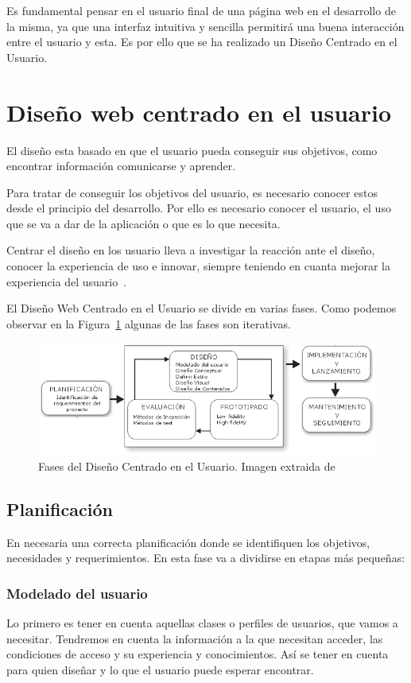 
Es fundamental pensar en el usuario final de una página web en el desarrollo de la misma, ya que una interfaz intuitiva y sencilla permitirá una buena interacción entre el usuario y esta. Es por ello que se ha realizado un Diseño Centrado en el Usuario.
\section{Diseño web centrado en el usuario}
El diseño esta basado en que el usuario pueda conseguir sus objetivos, como encontrar información comunicarse y aprender.

Para tratar de conseguir los objetivos del usuario, es necesario conocer estos desde el principio del desarrollo. Por ello es necesario conocer el usuario, el uso que se va a dar de la aplicación o que es lo que necesita.

Centrar el diseño en los usuario lleva a investigar la reacción ante el diseño, conocer la experiencia de uso e innovar, siempre teniendo en cuanta mejorar la experiencia del usuario~\cite{diseno_centrado_usuario_2016}.

El Diseño Web Centrado en el Usuario se divide en varias fases. Como podemos observar en la Figura~\ref{fig:DisCenUsu} algunas de las fases son iterativas.
\begin{figure}
\centering
\includegraphics[width=.9\textwidth]{img/diseno_centrado_usuario}
\caption[Fases del Diseño Centrado en el Usuario.]{Fases del Diseño Centrado en el Usuario. Imagen extraida de~\cite{diseno_imagen}}
\label{fig:DisCenUsu}
\end{figure}
\subsection{Planificación}
En necesaria una correcta planificación donde se identifiquen los objetivos, necesidades y requerimientos. En esta fase va a dividirse en etapas más pequeñas:

\subsubsection{Modelado del usuario}
Lo primero es tener en cuenta aquellas clases o perfiles de usuarios, que vamos a necesitar. Tendremos en cuenta la información a la que necesitan acceder, las condiciones de acceso y su experiencia y conocimientos. Así se tener  en cuenta para quien diseñar y lo que el usuario puede esperar encontrar.

